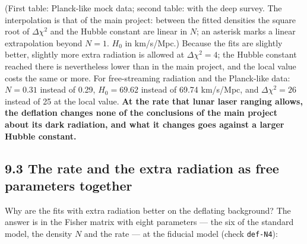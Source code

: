 \documentclass[
  10pt,
]{article}
\begin{document}
(First table: Planck-like mock data; second table: with the deep survey.
The interpolation is that of the main project: between the fitted
densities the square root of \(\Delta\chi^2\) and the Hubble constant
are linear in \(N\); an asterisk marks a linear extrapolation beyond
\(N=1\). \(H_0\) in km/s/Mpc.) Because the fits are slightly better,
slightly more extra radiation is allowed at \(\Delta\chi^2=4\); the
Hubble constant reached there is nevertheless lower than in the main
project, and the local value costs the same or more. For free-streaming
radiation and the Planck-like data: \(N=0.31\) instead of 0.29,
\(H_0=69.62\) instead of 69.74 km/s/Mpc, and \(\Delta\chi^2=26\) instead
of 25 at the local value. \textbf{At the rate that lunar laser ranging
allows, the deflation changes none of the conclusions of the main
project about its dark radiation, and what it changes goes against a
larger Hubble constant.}

\hypertarget{the-rate-and-the-extra-radiation-as-free-parameters-together}{%
\subsection{9.3 The rate and the extra radiation as free parameters
together}\label{the-rate-and-the-extra-radiation-as-free-parameters-together}}

Why are the fits with extra radiation better on the deflating
background? The answer is in the Fisher matrix with eight parameters ---
the six of the standard model, the density \(N\) and the rate --- at the
fiducial model (check \texttt{def-N4}):
\end{document}

